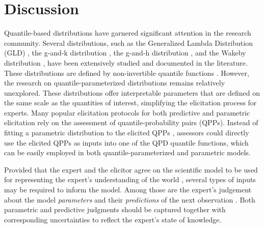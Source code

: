 \documentclass[
  fleqn,
  deca,
  blindrev
]{informs4}
\begin{document}
\section{Discussion}\label{discussion}

Quantile-based distributions have garnered significant attention in the
research community. Several distributions, such as the Generalized
Lambda Distribution (GLD)
\citep{freimer1988StudyGeneralizedTukey, ramberg1974ApproximateMethodGenerating},
the g-and-k distribution
\citep{haynes1997RobustnessRankingSelection, haynes2005BayesianEstimationGandk, prangle2017GkPackageGandk},
the g-and-h distribution
\citep{field2006MultivariateGandhDistribution, macgillivray1992ShapePropertiesGandh, rayner2002NumericalMaximumLikelihood},
and the Wakeby distribution
\citep{jeong-soo2005WakebyDistributionMaximum, rahman2015ApplicabilityWakebyDistribution, tarsitano2005FittingWakebyModel},
have been extensively studied and documented in the literature. These
distributions are defined by non-invertible quantile functions
\citep{perepolkin2023TenetsQuantilebasedInference}. However, the
research on quantile-parameterized distributions remains relatively
unexplored. These distributions offer interpretable parameters that are
defined on the same scale as the quantities of interest, simplifying the
elicitation process for experts. Many popular elicitation protocols for
both predictive and parametric elicitation rely on the assessment of
quantile-probability pairs (QPPs). Instead of fitting a parametric
distribution to the elicited QPPs
\citep{best2020PriorElicitation, ohagan2019ExpertKnowledgeElicitation},
assessors could directly use the elicited QPPs as inputs into one of the
QPD quantile functions, which can be easily employed in both
quantile-parameterized and parametric models.

Provided that the expert and the elicitor agree on the scientific model
to be used for representing the expert's understanding of the world
\citep{burgman2021ElicitingModelStructures}, several types of inputs may
be required to inform the model. Among those are the expert's judgement
about the model \emph{parameters}
\citep{mikkola2021PriorKnowledgeElicitation, ohagan2019ExpertKnowledgeElicitation}
and their \emph{predictions} of the next observation
\citep{akbarov2009ProbabilityElicitationPredictive, kadane1998ExperiencesElicitation, winkler1980PriorInformationPredictive}.
Both parametric and predictive judgments should be captured together
with corresponding uncertainties to reflect the expert's state of
knowledge.
\end{document}
